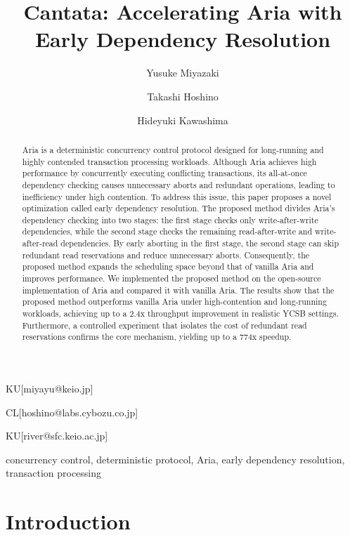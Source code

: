 \documentclass[english,preprint,JIP]{ipsj}
\begin{document}
\title{Cantata: Accelerating Aria with Early Dependency Resolution}


\author{Yusuke Miyazaki}{KU}[miyayu@keio.jp]
\author{Takashi Hoshino}{CL}[hoshino@labs.cybozu.co.jp]
\author{Hideyuki Kawashima}{KU}[river@sfc.keio.ac.jp]


\begin{abstract}
Aria is a deterministic concurrency control protocol designed for long-running and highly contended transaction processing workloads.
Although Aria achieves high performance by concurrently executing conflicting transactions, its all-at-once dependency checking causes unnecessary aborts and redundant operations, leading to inefficiency under high contention.
To address this issue, this paper proposes a novel optimization called early dependency resolution.
The proposed method divides Aria's dependency checking into two stages: the first stage checks only write-after-write dependencies, while the second stage checks the remaining read-after-write and write-after-read dependencies.
By early aborting in the first stage, the second stage can skip redundant read reservations and reduce unnecessary aborts.
Consequently, the proposed method expands the scheduling space beyond that of vanilla Aria and improves performance.
We implemented the proposed method on the open-source implementation of Aria and compared it with vanilla Aria.
The results show that the proposed method outperforms vanilla Aria under high-contention and long-running workloads, achieving up to a 2.4x throughput improvement in realistic YCSB settings.
Furthermore, a controlled experiment that isolates the cost of redundant read reservations confirms the core mechanism, yielding up to a 774x speedup.
\end{abstract}

\begin{keyword}
concurrency control, deterministic protocol, Aria, early dependency resolution, transaction processing
\end{keyword}

\maketitle

\section{Introduction}
\end{document}
